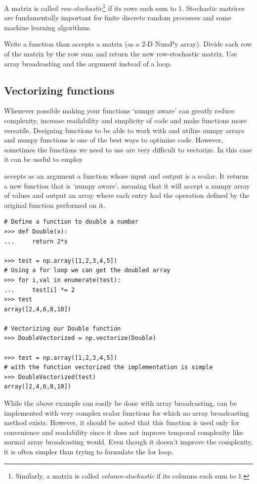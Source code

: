 \begin{problem} %
A matrix is called \emph{row-stochastic}\footnote{Similarly, a matrix is called \emph{column-stochastic} if its columns each sum to $1$.} if its rows each sum to $1$.
Stochastic matrices are fundamentally important for finite discrete random processes and some machine learning algorithms.

Write a function than accepts a matrix (as a 2-D NumPy array).
Divide each row of the matrix by the row sum and return the new row-stochastic matrix.
Use array broadcasting and the  argument instead of a loop.
\end{problem}

\subsection*{Vectorizing functions}

Whenever possible making your functions `numpy aware' can greatly reduce complexity, increase readability and simplicity of code and make functions more versatile. 
Designing functions to be able to work with and utilize numpy arrays and numpy functions is one of the best ways to optimize code. 
However, sometimes the functions we need to use are very difficult to vectorize. 
In this case it can be useful to employ 

 accepts as an argument a function whose input and output is a scalar. 
It returns a new function that is `numpy aware', meaning that it will accept a numpy array of values and output an array where each entry had the operation defined by the original function performed on it.

\begin{lstlisting}
# Define a function to double a number
>>> def Double(x):           
...		return 2*x

>>> test = np.array([1,2,3,4,5])
# Using a for loop we can get the doubled array
>>> for i,val in enumerate(test):   
...		test[i] *= 2
>>> test
array([2,4,6,8,10])

# Vectorizing our Double function
>>> DoubleVectorized = np.vectorize(Double)   

>>> test = np.array([1,2,3,4,5])
# with the function vectorized the implementation is simple
>>> DoubleVectorized(test)     
array([2,4,6,8,10])

\end{lstlisting}

\begin{info} %

While the above example can easily be done with array broadcasting,  can be implemented with very complex scalar functions for which no array broadcasting method exists. 
However, it should be noted that this function is used only for convenience and readability since it does not improve temporal complexity like normal array broadcasting would. 
Even though it doesn't improve the complexity, it is often simpler than trying to formulate the for loop.

\end{info}


